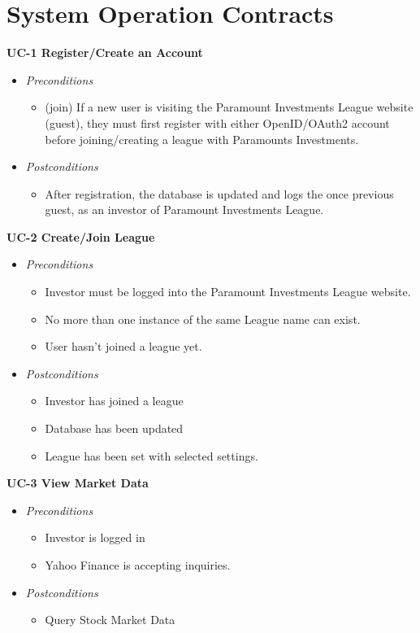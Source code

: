 \section{System Operation Contracts}



\textbf{UC-1 Register/Create an Account}
\begin{itemize}
	\item \emph{Preconditions}
		\begin{itemize}
		\item (join) If a new user is visiting the Paramount Investments League website (guest), they must first register with either OpenID/OAuth2 account before joining/creating a league with Paramounts Investments.
        \end{itemize}
	\item \emph{Postconditions}
		\begin{itemize}
		\item After registration, the database is updated and logs the once previous guest, as an investor of Paramount Investments League.		
        \end{itemize}
\end{itemize}

\textbf{UC-2 Create/Join League}
\begin{itemize}
	\item \emph{Preconditions}
		\begin{itemize}
\item Investor must be logged into the Paramount Investments League website.
\item No more than one instance of the same League name can exist.
\item User hasn’t joined a league yet.
				\end{itemize}
	\item \emph{Postconditions}
		\begin{itemize}
\item Investor has joined a league
\item Database has been updated
\item League has been set with selected settings.
			\end{itemize}
\end{itemize}

\textbf{UC-3 View Market Data}
\begin{itemize}
	\item \emph{Preconditions}
		\begin{itemize}
\item Investor is logged in
\item Yahoo Finance is accepting inquiries.
			\end{itemize}
	\item \emph{Postconditions}
		\begin{itemize}
		\item Query Stock Market Data
		\end{itemize}
\end{itemize}

